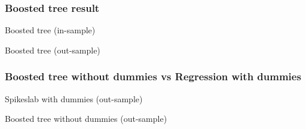 \documentclass{beamer}
\begin{document}
\begin{frame}
\frametitle{Boosted tree result}
\begin{table}
	
	\caption{Boosted tree (in-sample)}
\end{table}
\begin{table}
	
	\caption{Boosted tree (out-sample)}
\end{table}
\end{frame}

\begin{frame}
\frametitle{Boosted tree without dummies vs Regression with dummies}
\begin{table}
	
	\caption{Spikeslab with dummies (out-sample)}
\end{table}
\begin{table}
	
	\caption{Boosted tree without dummies (out-sample)}
\end{table}
\end{frame}
\end{document}
